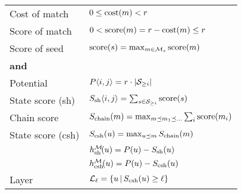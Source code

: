 \begin{table}[h]
\begin{tabular}{ll}
	\tabindent Cost of match & $0 \leq \operatorname{cost}(m) < r$\\
	\tabindent Score of match & $0 < \operatorname{score}(m) = r - \operatorname{cost}(m) \leq r$\\
	\tabindent Score of seed & $\operatorname{score}(s) = \max_{m\in \mathcal M_s} \operatorname{score}(m)$\\
	\hline
	\multicolumn{2}{l}{\textbf{\Sh and \csh}} \\
	\tabindent Potential & $P\langle i, j \rangle  = r \cdot |\mathcal S_{\geq i}|$ \\
	\tabindent State score (sh) &
							 $S_{\mathrm{sh}} \langle i, j \rangle = \sum_{s\in \mathcal S_{\geq i}} \operatorname{score}(s)$ \\
	\tabindent Chain score & $S_{\mathrm{chain}}(m) = \max_{m\preceq m_1 \preceq \dots} \sum_i \operatorname{score}(m_i)$\\
	\tabindent State score (csh) & $S_{\mathrm{csh}}(u) = \max_{u\preceq m} S_{\mathrm{chain}}(m)$\\
	\tabindent \Sh & $h_{\mathrm{sh}}^\mathcal M\!(u) = P(u) - S_{\mathrm{sh}}(u)$\\
	\tabindent \Csh & $h_{\mathrm{csh}}^\mathcal M\!(u) = P(u) - S_{\mathrm{csh}}(u)$\\
	\tabindent Layer & $\mathcal L_\ell = \{u\, | \, S_{\mathrm{csh}}(u) \geq \ell\}$
  \end{tabular}
\end{table}

